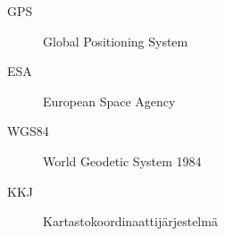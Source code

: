 \documentclass[dissertation,vertlayout,pdfa,colorlinks,nologo,table]{aaltoseries}
\begin{document}
\begin{abstract}[finnish]
Zirkoniumoksidin perustavanlaatuisia ominaisuuksia tarkasteltiin perustuen 
mikroskooppisten hilavirheiden muuttumiseen tutkittavissa Zircaloy-4 -näyt\-teissä, joita
oli hapetettu painevesireaktoria vastaavissa olosuhteissa. Doppler-levenemä\-spektroskopiaa
ja teoreettista mallinnusta sovellettiin hapettumiskerrosten hilavirheiden tutkimiseen. 
Positronien elinaikaspektrokopiaa käytettiin toivutettujen ja protonisäteilytykselle 
altistettujen volframinäytteiden monovakanssien tutkimiseen. Välisija-atomien
ja monovakanssien migraatioenergiarajat pystyttiin havaitsemaan suoraan 
elinaikaspektrometrilla, joka oli yhdistetty kylmäsäteilytyslaitteistoon.

\end{abstract}


\begin{abstract}[swedish]\lipsum[7-9]\end{abstract}


\begin{preface}
\lipsum[1-4]
\end{preface}

\clearpage
\tableofcontents


\listofpublications

\listoffigures
\listoftables


\abbreviations

\begin{description}
\item[GPS] Global Positioning System
\item[ESA] European Space Agency
\item[WGS84] World Geodetic System 1984
\item[KKJ] Kartastokoordinaattijärjestelmä
\end{description}
\end{document}
